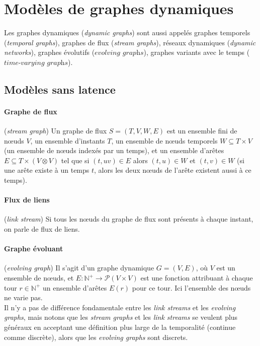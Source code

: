 \documentclass[12pt,a4paper]{article}
\begin{document}
\section{Modèles de graphes dynamiques}

Les graphes dynamiques (\textit{dynamic graphs}) sont aussi appelés
graphes temporels (\textit{temporal graphs}), graphes de flux
(\textit{stream graphs}), réseaux dynamiques (\textit{dynamic
  networks}), graphes évolutifs (\(\textit{evolving graphs}\)),
graphes variants avec le temps (\(\textit{time-varying graphs}\)).

\subsection{Modèles sans latence}

\paragraph{Graphe de flux}\cite{DBLP:journals/corr/abs-1710-04073}
(\textit{stream graph}) Un graphe de flux \(S = (T, V, W, E)\) est un
ensemble fini de nœuds \(V\), un ensemble d'instants \(T\), un
ensemble de nœuds temporels \(W \subseteq T \times V\) (un ensemble de
nœuds indexés par un temps), et un ensemble d'arêtes
\(E \subseteq T \times (V \otimes V)\) tel que si \((t, uv) \in E\)
alors \((t, u) \in W\) et \((t, v) \in W\) (si une arête existe à un
temps \(t\), alors les deux nœuds de l'arête existent aussi à ce
temps).

\paragraph{Flux de liens}\cite{DBLP:journals/corr/abs-1710-04073}
(\textit{link stream}) Si tous les nœuds du graphe de flux sont
présents à chaque instant, on parle de flux de liens.

\paragraph{Graphe évoluant}\cite{DBLP:journals/sigact/KuhnO11}
(\textit{evolving graph}) Il s'agit d'un graphe dynamique
\(G = (V, E)\), où \(V\) est un ensemble de nœuds, et
\(E : \mathbb{N}^{+} \to \mathcal{P}(V \times V)\) est une fonction
attribuant à chaque tour \(r \in \mathbb{N}^{+}\) un ensemble d'arêtes
\(E(r)\) pour ce tour. Ici l'ensemble des nœuds ne varie pas.\\

Il n'y a pas de différence fondamentale entre les \textit{link
  streams} et les \textit{evolving graphs}, mais notons que les
\textit{stream graphs} et les \textit{link streams} se veulent plus
généraux en acceptant une définition plus large de la temporalité
(continue comme discrète), alors que les \textit{evolving graphs} sont
discrets.
\end{document}
